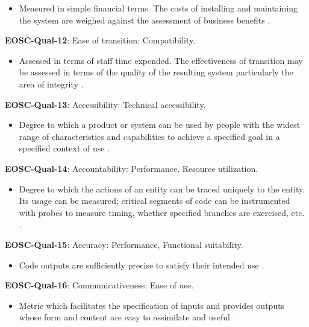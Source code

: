 \begin{itemize}
    \item Measured in simple financial terms. The costs of installing and maintaining the system are weighed against the assessment of business benefits \cite{gillies_modelling_1992}.
\end{itemize}

\textbf{EOSC-Qual-12}: Ease of transition: Compatibility.

\begin{itemize}
    \item Assessed in terms of staff time expended. The effectiveness of transition may be assessed in terms of the quality of the resulting system particularly the area of integrity \cite{iso_25010_2011_2017,gillies_modelling_1992}.
\end{itemize}

\textbf{EOSC-Qual-13}: Accessibility: Technical accessibility.

\begin{itemize}
    \item Degree to which a product or system can be used by people with the widest range of characteristics and capabilities to achieve a specified goal in a specified context of use \cite{iso_25010_2011_2017,boehm_quantitative_1976}.
\end{itemize}

\textbf{EOSC-Qual-14}: Accountability: Performance, Resource utilization.

\begin{itemize}
    \item Degree to which the actions of an entity can be traced uniquely to the entity. Its usage can be measured; critical segments of code can be instrumented with probes to measure timing, whether specified branches are exercised, etc. \cite{iso_25010_2011_2017,boehm_quantitative_1976}.
\end{itemize}

\textbf{EOSC-Qual-15}: Accuracy: Performance, Functional suitability.

\begin{itemize}
    \item Code outputs are sufficiently precise to satisfy their intended use \cite{boehm_quantitative_1976}.
\end{itemize}

\textbf{EOSC-Qual-16}: Communicativeness: Ease of use.

\begin{itemize}
    \item Metric which facilitates the specification of inputs and provides outputs whose form and content are easy to assimilate and useful \cite{boehm_quantitative_1976,raymond_software_2013}.
\end{itemize}

